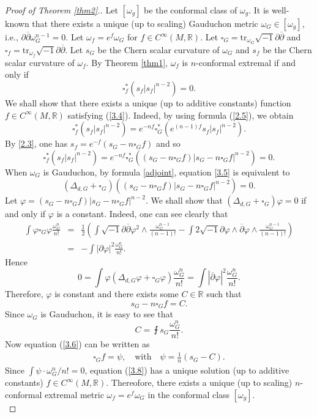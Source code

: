 \documentclass[12pt]{amsart}
\newcommand\bp{{\bar\partial}}
\theoremstyle{plain}
\theoremstyle{definition}
\newcommand{\sq}{\sqrt{-1}}
\newcommand{\p}{\partial}
\renewcommand{\bar}{\overline}
\renewcommand{\phi}{\varphi}
\newcommand{\beq}{\begin{equation}}
\newcommand{\eeq}{\end{equation}}
\newcommand{\ee}{\end{eqnarray*}}
\newcommand{\be}{\begin{eqnarray*}}
\renewcommand{\bp}{\bar{\partial}}
\renewcommand{\>}{\rightarrow}
\newcommand{\R}{{\mathbb R}}
\renewcommand{\#}{\sharp}
\newcommand{\lrp}[1]{\left( #1\right)}
\newcommand{\tr}{\mathrm{tr}}
\numberwithin{equation}{section} %
\begin{document}
\baselineskip

    \begin{proof}[Proof of Theorem \ref{thm2}.]  Let $[\omega_g]$ be the conformal class of $\omega_g$.  It is well-known that there exists a unique (up to scaling) Gauduchon metric $\omega_G\in[\omega_g]$, i.e., $\p\bp\omega_G^{n-1}=0$. Let $\omega_f=e^f\omega_G$ for  $f\in C^\infty(M,\R)$. Let $\square_G =\tr_{\omega_G}\sq\p\bar\p$ and $\square_f =\tr_{\omega_f}\sq\p\bar\p$. Let $s_G$ be the Chern scalar curvature of $\omega_G$ and $s_f$ be the Chern scalar curvature of $\omega_f$.     By Theorem \ref{thm1},  $\omega_f$ is $n$-conformal extremal if and only if
        \beq\label{3.4}
            \square_f^*(s_f|s_f|^{n-2})=0.
        \eeq We shall show that there exists a unique (up to additive constants) function $f\in C^\infty(M,\R)$ satisfying (\ref{3.4}). Indeed, by using formula
    (\ref{2.5}), we obtain
        \beq\label{3.51}
        \square_f^*\left(s_f|s_f|^{n-2}\right)=e^{-nf}\square_G^*\left(e^{(n-1)f}s_f|s_f|^{n-2}\right).
        \eeq
        By \eqref{2.3}, one has $s_f=e^{-f}\lrp{s_G-n\square_G f}$ and so
        \beq\label{3.5}
        \square_f^*\left(s_f|s_f|^{n-2}\right)=e^{-nf}\square_G^*\left(\left(s_G-n\square_Gf\right)\left|s_G-n\square_Gf\right|^{n-2}\right)=0.
        \eeq
 When $\omega_G$ is Gauduchon,  by formula \eqref{adjoint}, equation \eqref{3.5} is equivalent to
 \beq \left(\Delta_{d,G}+\square_G\right)\left(\left(s_G-n\square_Gf\right)\left|s_G-n\square_Gf\right|^{n-2}\right)=0. \eeq
 Let $\phi= \left(s_G-n\square_Gf\right)\left|s_G-n\square_Gf\right|^{n-2}.$
 We shall show that $\left(\Delta_{d,G}+\square_G\right)\phi=0$ if and only if $\phi$ is a constant. Indeed, one can see clearly that
 \be \int\phi \square_G\phi \frac{\omega_G^{n}}{n!}&=&\frac{1}{2}\left(\int\sq \p\bp\phi^2\wedge  \frac{\omega_G^{n-1}}{(n-1)!}-\int 2\sq \p\phi\wedge\bp\phi\wedge \frac{\omega_G^{n-1}}{(n-1)!} \right)\\&=&-\int |\p\phi|^2 \frac{\omega_G^{n}}{n!}. \ee
    Hence
\beq 0= \int\phi  \left(\Delta_{d,G}\phi+\square_G\phi\right)  \frac{\omega_G^{n}}{n!}=\int |\bp\phi|^2 \frac{\omega_G^{n}}{n!}.\eeq
    Therefore, $\phi$ is constant and there exists some  $C\in\R$ such that
        \beq\label{3.6}
            s_G-n\square_Gf=C.
        \eeq
    Since $\omega_G$ is Gauduchon,  it is easy to see that
        \beq C=\intbar s_G  \frac{\omega_G^{n}}{n!}.\eeq
    Now equation (\ref{3.6}) can be written as
        \begin{align}\label{3.8}
            \square_Gf=\psi,\quad\text{with}\quad\psi=\frac1n\lrp{s_G-C}.
        \end{align}
        Since $\int\psi\cdot\omega_G^n/n!=0$, equation  (\ref{3.8}) has a unique solution (up to additive constants) $f\in C^\infty(M,\R)$. Thereofore, there exists a unique (up to scaling) $n$-conformal extremal metric $\omega_f=e^f\omega_G$ in the conformal class $[\omega_g]$.\\


\end{proof}
\end{document}
